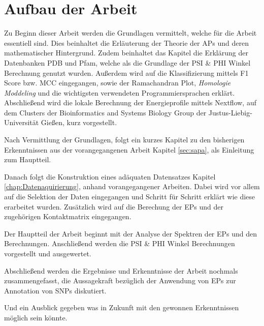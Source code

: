 \section{Aufbau der Arbeit}

Zu Beginn dieser Arbeit werden die Grundlagen vermittelt, welche für die Arbeit essentiell sind. Dies beinhaltet die Erläuterung der Theorie der \ac{APs} und deren mathematischer Hintergrund. Zudem beinhaltet das Kapitel die Erklärung der Datenbanken \ac{PDB} und \ac{Pfam}, welche als die Grundlage der PSI \& PHI Winkel Berechnung genutzt wurden. 
Außerdem wird auf die Klassifizierung mittels F1 Score bzw. \ac{MCC} eingegangen, sowie der Ramachandran Plot, \emph{Homologie Moddeling} und die wichtigsten verwendeten Programmiersprachen
erklärt. Abschließend wird die lokale Berechnung der Energieprofile mittels Nextflow, auf dem Clusters der Bioinformatics and Systems Biology Group der Justus-Liebig-Universität Gießen, kurz vorgestellt.

Nach Vermittlung der Grundlagen, folgt ein kurzes Kapitel zu den bisherigen Erkenntnissen aus der vorangegangenen Arbeit Kapitel \ref{sec:sapa}, als Einleitung zum Hauptteil.

Danach folgt die Konstruktion eines adäquaten Datensatzes Kapitel \ref{chap:Datenaquirierung}, anhand vorangegangener Arbeiten\cite{Mathias.2014}. Dabei wird vor allem auf die Selektion der Daten eingegangen und Schritt für Schritt erklärt wie diese erarbeitet wurden. Zusätzlich wird auf die Berechung der \ac{EP}s und der zugehörigen Kontaktmatrix eingegangen.

Der Hauptteil der Arbeit beginnt mit der Analyse der Spektren der \ac{EP}s und den Berechnungen. Anschließend werden die PSI \& PHI Winkel Berechnungen vorgestellt und ausgewertet.



Abschließend werden die Ergebnisse und Erkenntnisse der Arbeit nochmals zusammengefasst, die Aussagekraft bezüglich der Anwendung von \ac{EP}s zur Annotation von \ac{SNP}s diskutiert.

Und ein Ausblick gegeben was in Zukunft mit den gewonnen Erkenntnissen möglich sein könnte.


